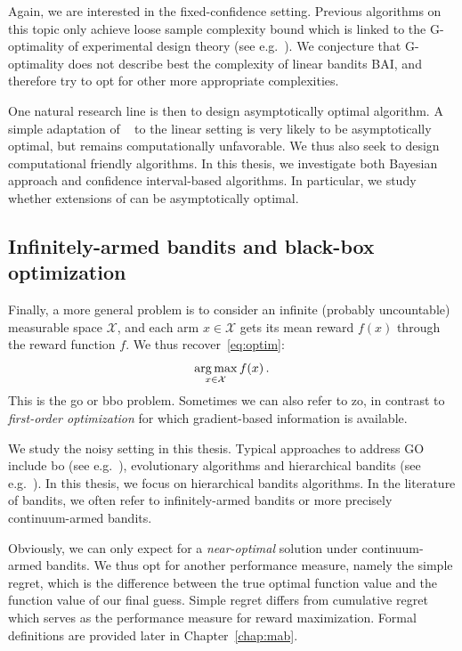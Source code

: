 Again, we are interested in the fixed-confidence setting. Previous algorithms on this topic only achieve loose sample complexity bound which is linked to the \gls{G-optimality} of experimental design theory (see e.g.~\citealt{pukelsheim2006optimal}). We conjecture that G-optimality does not describe best the complexity of linear bandits BAI, and therefore try to opt for other more appropriate complexities.

One natural research line is then to design asymptotically optimal algorithm. A simple adaptation of \Track~\citep{garivier2016tracknstop} to the linear setting is very likely to be asymptotically optimal, but remains computationally unfavorable. We thus also seek to design computational friendly algorithms. In this thesis, we investigate both Bayesian approach and confidence interval-based algorithms. In particular, we study whether extensions of \TTTS can be asymptotically optimal.

\subsection{Infinitely-armed bandits and black-box optimization}\label{sec:intro.mab.bbo}

Finally, a more general problem is to consider an infinite (probably uncountable) measurable space $\mathcal{X}$, and each arm $x\in\mathcal{X}$ gets its mean reward $f(x)$ through the reward function $f$. We thus recover~\eqref{eq:optim}:
\[
    \operatorname*{arg\,max}_{x\in\mathcal{X}} f(x)\,.
\]
This is the \gls{go} or \gls{bbo} problem. Sometimes we can also refer to \gls{zo}, in contrast to \emph{first-order optimization} for which gradient-based information is available.

We study the noisy setting in this thesis. Typical approaches to address GO include \gls{bo} (see e.g.~\citealt{brochu2010bayesian}), evolutionary algorithms and hierarchical bandits (see e.g.~\citealt{bubeck2010x}). In this thesis, we focus on hierarchical bandits algorithms. In the literature of bandits, we often refer to \gls{infinitely-armed bandits} or more precisely \gls{continuum-armed bandits}.

Obviously, we can only expect for a \emph{near-optimal} solution under continuum-armed bandits. We thus opt for another performance measure, namely the \gls{simple regret}, which is the difference between the true optimal function value and the function value of our final guess. Simple regret differs from \gls{cumulative regret} which serves as the performance measure for reward maximization. Formal definitions are provided later in Chapter~\ref{chap:mab}.

